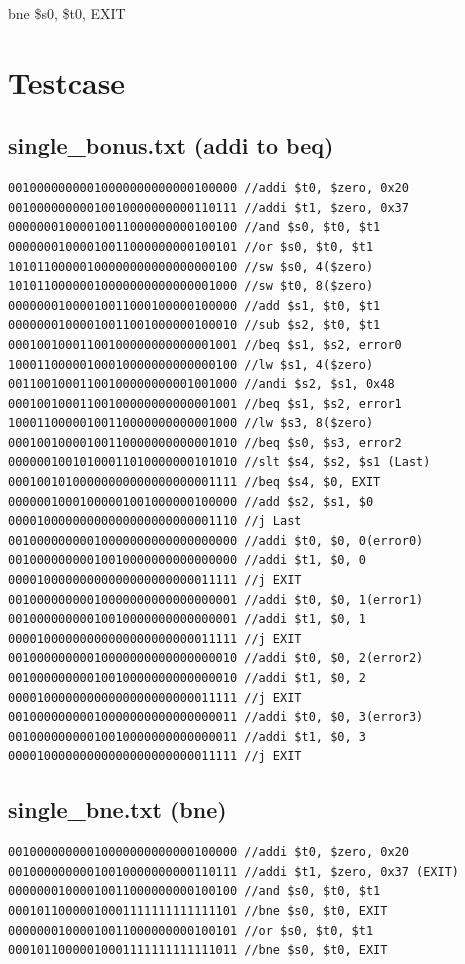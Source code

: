 \documentclass{article}
\begin{document}
bne \$s0, \$t0, EXIT


\section{Testcase}

\subsection{single\_bonus.txt (addi to beq)}

\begin{lstlisting}
00100000000010000000000000100000 //addi $t0, $zero, 0x20
00100000000010010000000000110111 //addi $t1, $zero, 0x37
00000001000010011000000000100100 //and $s0, $t0, $t1
00000001000010011000000000100101 //or $s0, $t0, $t1
10101100000100000000000000000100 //sw $s0, 4($zero)
10101100000010000000000000001000 //sw $t0, 8($zero)
00000001000010011000100000100000 //add $s1, $t0, $t1
00000001000010011001000000100010 //sub $s2, $t0, $t1
00010010001100100000000000001001 //beq $s1, $s2, error0
10001100000100010000000000000100 //lw $s1, 4($zero)
00110010001100100000000001001000 //andi $s2, $s1, 0x48
00010010001100100000000000001001 //beq $s1, $s2, error1
10001100000100110000000000001000 //lw $s3, 8($zero)
00010010000100110000000000001010 //beq $s0, $s3, error2
00000010010100011010000000101010 //slt $s4, $s2, $s1 (Last)
00010010100000000000000000001111 //beq $s4, $0, EXIT
00000010001000001001000000100000 //add $s2, $s1, $0
00001000000000000000000000001110 //j Last
00100000000010000000000000000000 //addi $t0, $0, 0(error0)
00100000000010010000000000000000 //addi $t1, $0, 0
00001000000000000000000000011111 //j EXIT
00100000000010000000000000000001 //addi $t0, $0, 1(error1)
00100000000010010000000000000001 //addi $t1, $0, 1
00001000000000000000000000011111 //j EXIT
00100000000010000000000000000010 //addi $t0, $0, 2(error2)
00100000000010010000000000000010 //addi $t1, $0, 2
00001000000000000000000000011111 //j EXIT
00100000000010000000000000000011 //addi $t0, $0, 3(error3)
00100000000010010000000000000011 //addi $t1, $0, 3
00001000000000000000000000011111 //j EXIT
\end{lstlisting}

\subsection{single\_bne.txt (bne)}

\begin{lstlisting}
00100000000010000000000000100000 //addi $t0, $zero, 0x20
00100000000010010000000000110111 //addi $t1, $zero, 0x37 (EXIT)
00000001000010011000000000100100 //and $s0, $t0, $t1
00010110000010001111111111111101 //bne $s0, $t0, EXIT
00000001000010011000000000100101 //or $s0, $t0, $t1
00010110000010001111111111111011 //bne $s0, $t0, EXIT
\end{lstlisting}
\end{document}

